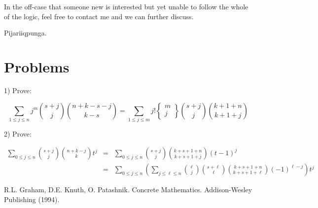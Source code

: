 \documentclass[twoside]{amsart}
\begin{document}
In the off-case that someone new is interested but yet unable to follow the whole of the logic, feel
free to contact me and we can further discuss.

Pijariiqpunga.

\section{Problems}

1) Prove:

$$  \sum_{1\le j\le n}j^m{s+j\choose j}{n+k-s-j\choose k-s}
    =\sum_{1\le j\le m}j!
    \left\{\!\!\!\begin{array}{c} m \\ j \end{array}\!\!\!\right\}
    {s+j\choose j}{k+1+n\choose k+1+j}  $$

2) Prove:

\begin{eqnarray*}
\sum_{0\le j\le n}{s+j\choose j}{n+k-j\choose k}t^j
 & = & \sum_{0\le j\le n}{s+j\choose j}{k+s+1+n\choose k+s+1+j}(t-1)^j    \\
 & = & \sum_{0\le j\le n}\left(\sum_{j\le\ell\le n}{\ell\choose j}
       {s+\ell\choose\ell}{k+s+1+n\choose k+s+1+\ell}(-1)^{\ell-j}\right)t^j
\end{eqnarray*}       

\begin{thebibliography}{99}
 R.L. Graham, D.E. Knuth, O. Patashnik.  Concrete
         Mathematics.  Addison-Wesley Publishing (1994).
\end{thebibliography}
\end{document}
